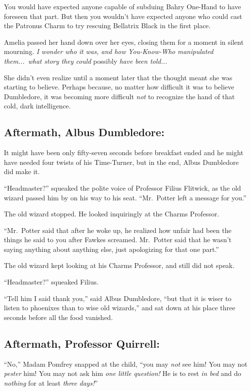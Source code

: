 You would have expected anyone capable of subduing Bahry One-Hand to have foreseen that part. But then you wouldn’t have expected anyone who could cast the Patronus Charm to try rescuing Bellatrix Black in the first place.

Amelia passed her hand down over her eyes, closing them for a moment in silent mourning. \emph{I wonder who it was, and how You-Know-Who manipulated them...\ what story they could} possibly \emph{have been told...}

She didn’t even realize until a moment later that the thought meant she was starting to believe. Perhaps because, no matter how difficult it was to believe Dumbledore, it was becoming more difficult \emph{not} to recognize the hand of that cold, dark intelligence.
\replacement{\sbreak}{}

\subsection{Aftermath, Albus Dumbledore:}

\noindent{}It might have been only fifty-seven seconds before breakfast ended and he might have needed four twists of his Time-Turner, but in the end, Albus Dumbledore did make it.

“Headmaster?” squeaked the polite voice of Professor Filius Flitwick, as the old wizard passed him by on his way to his seat. “Mr.~Potter left a message for you.”

The old wizard stopped. He looked inquiringly at the Charms Professor.

“Mr.~Potter said that after he woke up, he realized how unfair had been the things he said to you after Fawkes screamed. Mr.~Potter said that he wasn’t saying anything about anything else, just apologizing for that one part.”

The old wizard kept looking at his Charms Professor, and still did not speak.

“Headmaster?” squeaked Filius.

“Tell him I said thank you,” said Albus Dumbledore, “but that it is wiser to listen to phoenixes than to wise old wizards,” and sat down at his place three seconds before all the food vanished.
\replacement{\sbreak}{}

\subsection{Aftermath, Professor Quirrell:}

\noindent{}“No,” Madam Pomfrey snapped at the child, “you may \emph{not} see him! You may not \emph{pester} him! You may not ask him \emph{one little question!} He is to rest \emph{in bed} and do \emph{nothing} for at least \emph{three days!}”
\replacement{\sbreak}{}

